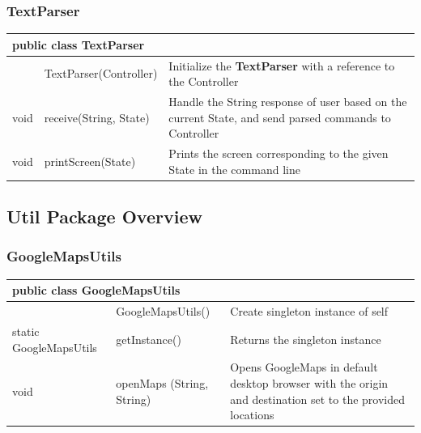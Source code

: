 \documentclass[12pt]{article}
\begin{document}
\newpage
\subsubsection{TextParser}
\begin{center}
\begin{tabular}{p{0.1\hsize}|p{0.25\hsize}|p{0.50\hsize}}
\multicolumn{3}{l}{\textbf{public class TextParser}} \\
\hline
 & TextParser(Controller) & Initialize the \textbf{TextParser} with a reference to the Controller \\
\hline
void & receive(String, State) & Handle the String response of user based on the current State, and send parsed commands to Controller\\
\hline
void & printScreen(State) & Prints the screen corresponding to the given State in the command line\\
\hline
\end{tabular}
\end{center}



\newpage
\subsection{Util Package Overview}
\subsubsection{GoogleMapsUtils}
\begin{center}
\begin{tabular}{p{0.15\hsize}|p{0.25\hsize}|p{0.45\hsize}}
\multicolumn{3}{l}{\textbf{public class GoogleMapsUtils}} \\
\hline
 & GoogleMapsUtils() & Create singleton instance of self \\
\hline
static GoogleMapsUtils & getInstance() & Returns the singleton instance \\
\hline
void 	& openMaps (String, String) & Opens GoogleMaps in default desktop browser with the origin and destination set to the provided locations \\
\hline
\end{tabular}
\end{center}

\bigskip
\end{document}
